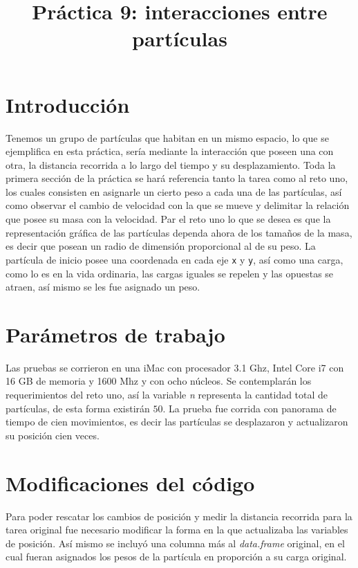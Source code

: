 \documentclass[a4paper]{article}
\title{Práctica 9: interacciones entre partículas}
\begin{document}
\maketitle

\section{Introducci\'on}
Tenemos un grupo de partículas que habitan en un mismo espacio, lo que se ejemplifica en esta práctica, sería mediante la interacción que poseen una con otra, la distancia recorrida a lo largo del tiempo y su desplazamiento. Toda la primera sección de la práctica se hará referencia tanto la tarea como al reto uno, los cuales consisten en asignarle un cierto peso a cada una de las partículas, así como observar el cambio de velocidad con la que se mueve y delimitar la relación que posee su masa con la velocidad. Par el reto uno lo que se desea es que la representación gráfica de las partículas dependa ahora de los tamaños de la masa, es decir que posean un radio de dimensión proporcional al de su peso. La partícula de inicio posee una coordenada en cada eje \texttt{x} y \texttt{y}, así como una carga, como lo es en la vida ordinaria, las cargas iguales se repelen y las opuestas se atraen, así mismo se les fue asignado un peso.

\section{Par\'ametros de trabajo}
Las pruebas se corrieron en una iMac con procesador 3.1 Ghz, Intel Core i7 con 16 GB de memoria y 1600 Mhz y con ocho núcleos. Se contemplarán los requerimientos del reto uno, así la variable \textit{n} representa la cantidad total de partículas, de esta forma existirán $50$. La prueba fue corrida con panorama de tiempo de cien movimientos, es decir las partículas se desplazaron y actualizaron su posición cien veces.

\section{Modificaciones del código}
Para poder rescatar los cambios de posición y medir la distancia recorrida para la tarea original fue necesario modificar la forma en la que actualizaba las variables de posición. Así mismo se incluyó una columna más al \textit{data.frame} original, en el cual fueran asignados los pesos de la partícula en proporción a su carga original.
\end{document}

